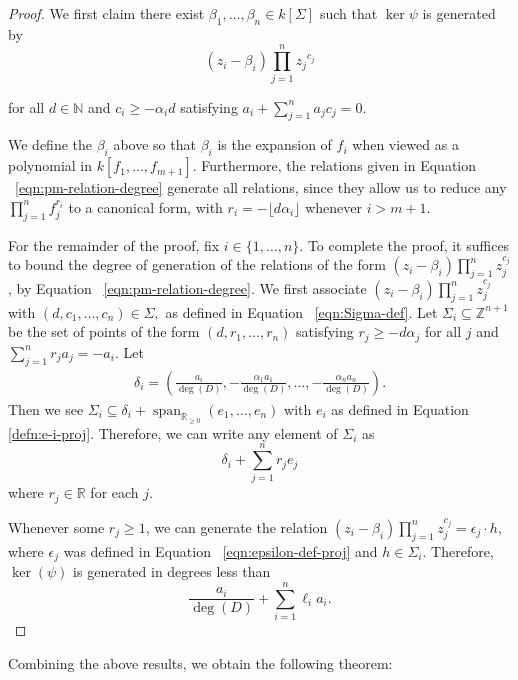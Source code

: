 \documentclass{amsart}
\theoremstyle{plain}
\theoremstyle{definition}
\theoremstyle{remark}
\numberwithin{equation}{section}
\newcommand\br{{\mathbb R}}
\newcommand\bida{a}
\DeclareMathOperator{\newspan}{span}
\begin{document}
\begin{proof}
We first claim there exist $\beta_1, \ldots, \beta_n \in k[\Sigma]$ such that $\ker \psi$ is generated by
\begin{equation}
\label{eqn:relations-psi-proj}
	(z_i - \beta_i)\prod_{j=1}^n {z_j}^{c_{j}}
\end{equation}

\noindent
for all $d \in \mathbb{N}$ and $c_i \ge -\alpha_i d$ satisfying $\bida_i + \sum_{j = 1}
^n \bida_j c_j = 0$.

We define the $\beta_i$ above so that $\beta_i$ is the expansion of $f_i$ when viewed as a polynomial in $k[f_1,\ldots, f_{m+1}]$. Furthermore, the relations given in Equation ~\eqref{eqn:pm-relation-degree}
generate all relations, since they allow us to reduce any $\prod_{j =
1}^n f_j^{r_i}$ to a canonical form, with $r_i = -\lfloor d \alpha_i\rfloor$ whenever $i  > m + 1$.

For the remainder of the proof, fix $i \in \{1,\ldots, n\}$. 
To complete the proof, it suffices to bound the degree of generation of the relations of the form $(z_i - \beta_i) \prod_{j=1}^n z_j^{c_j}$, by 
Equation ~\eqref{eqn:pm-relation-degree}.  We first associate $(z_i - \beta_i)\prod_{j=1}^n z_j^{c_j}$ with $(d, c_1, \ldots, c_n) \in \Sigma,$ as defined in Equation ~\eqref{eqn:Sigma-def}.  
Let $\Sigma_i \subseteq \mathbb{Z}^{n+1}$ be the set of points of the form $(d, r_1, \ldots, r_n)$ satisfying $r_j \ge -d \alpha_j$ for all $j$ and $\sum_{j=1}^n r_j a_j = -a_i$.  Let 
\begin{align*}
	\delta_i = \left(\frac{a_i}{\deg(D)}, -\frac{\alpha_1 a_1}{\deg(D)}, \ldots, - \frac{\alpha_n a_n}{\deg(D)} \right).
\end{align*}
Then we see $\Sigma_i \subseteq \delta_i + \newspan_{\br_{\geq 0}}(e_1, \ldots, e_n)$ with $e_i$ as defined in Equation \ref{defn:e-i-proj}.
Therefore, we can write any element of $\Sigma_i$ as
\[
	\delta_i + \sum_{j=1}^n r_j e_j
\]
where $r_j \in \mathbb{R}$ for each $j$.

Whenever some $r_j \ge 1$, we can generate the relation $(z_i - \beta_i)\prod_{j=1}^n z_j^{c_j} = \epsilon_j \cdot h,$ where $\epsilon_j$ was defined in Equation ~\ref{eqn:epsilon-def-proj} and $h \in \Sigma_i$.  Therefore, $\ker(\psi)$ is generated in degrees less than
\[
	\frac{\bida_i}{\deg(D)} + \sum_{i=1}^n \ell_i a_i.
\]
\end{proof}


Combining the above results, we obtain the following theorem:
\end{document}
